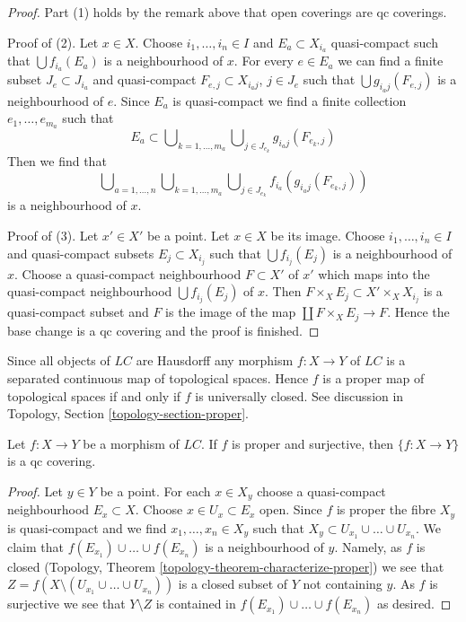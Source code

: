 \begin{proof}
Part (1) holds by the remark above that open coverings are qc coverings.

\medskip\noindent
Proof of (2). Let $x \in X$. Choose $i_1, \ldots, i_n \in I$ and
$E_a \subset X_{i_a}$ quasi-compact such that $\bigcup f_{i_a}(E_a)$
is a neighbourhood of $x$. For every $e \in E_a$ we can find
a finite subset $J_e \subset J_{i_a}$ and quasi-compact
$F_{e, j} \subset X_{i_a j}$, $j \in J_e$ such that $\bigcup g_{i_a j}(F_{e, j})$
is a neighbourhood of $e$. Since $E_a$ is quasi-compact we find
a finite collection $e_1, \ldots, e_{m_a}$ such that
$$
E_a \subset
\bigcup\nolimits_{k = 1, \ldots, m_a}
\bigcup\nolimits_{j \in J_{e_k}} g_{i_a j}(F_{e_k, j})
$$
Then we find that
$$
\bigcup\nolimits_{a = 1, \ldots, n}
\bigcup\nolimits_{k = 1, \ldots, m_a}
\bigcup\nolimits_{j \in J_{e_k}} f_{i_a}(g_{i_a j}(F_{e_k, j}))
$$
is a neighbourhood of $x$.

\medskip\noindent
Proof of (3). Let $x' \in X'$ be a point. Let $x \in X$ be its image.
Choose $i_1, \ldots, i_n \in I$ and quasi-compact subsets
$E_j \subset X_{i_j}$ such that $\bigcup f_{i_j}(E_j)$ is a
neighbourhood of $x$. Choose a quasi-compact neighbourhood $F \subset X'$
of $x'$ which maps into the quasi-compact neighbourhood
$\bigcup f_{i_j}(E_j)$ of $x$. Then
$F \times_X E_j \subset X' \times_X X_{i_j}$ is a
quasi-compact subset and $F$ is the image of the map
$\coprod F \times_X E_j \to F$. Hence the base change is a
qc covering and the proof is finished.
\end{proof}

\noindent
Since all objects of $\textit{LC}$ are Hausdorff any morphism
$f : X \to Y$ of $\textit{LC}$ is a separated continuous map
of topological spaces. Hence $f$ is a proper map of topological spaces
if and only if $f$ is universally closed. See discussion in
Topology, Section \ref{topology-section-proper}.

\begin{lemma}
\label{lemma-proper-surjective-is-qc-covering}
Let $f : X \to Y$ be a morphism of $\textit{LC}$.
If $f$ is proper and surjective, then $\{f : X \to Y\}$
is a qc covering.
\end{lemma}

\begin{proof}
Let $y \in Y$ be a point. For each $x \in X_y$ choose a quasi-compact
neighbourhood $E_x \subset X$. Choose $x \in U_x \subset E_x$ open.
Since $f$ is proper the fibre $X_y$ is quasi-compact and we find
$x_1, \ldots, x_n \in X_y$ such that
$X_y \subset U_{x_1} \cup \ldots \cup U_{x_n}$.
We claim that $f(E_{x_1}) \cup \ldots \cup f(E_{x_n})$ is a neighbourhood of
$y$. Namely, as $f$ is closed
(Topology, Theorem \ref{topology-theorem-characterize-proper})
we see that $Z = f(X \setminus (U_{x_1} \cup \ldots \cup U_{x_n}))$
is a closed subset of $Y$ not containing $y$. As $f$ is surjective
we see that $Y \setminus Z$ is contained in
$f(E_{x_1}) \cup \ldots \cup f(E_{x_n})$ as desired.
\end{proof}

